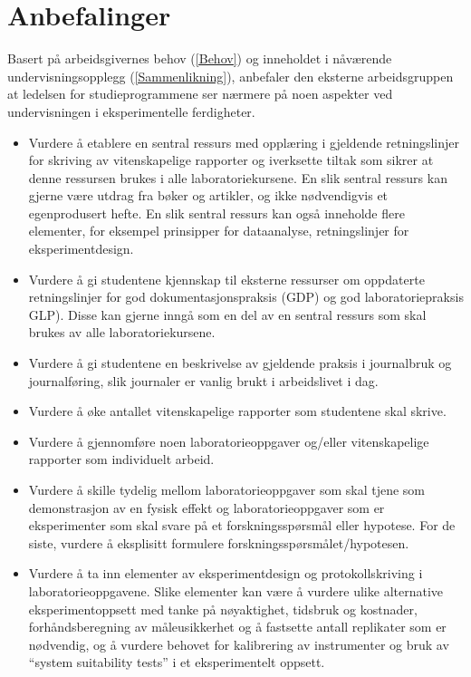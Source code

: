 \documentclass{article}
\begin{document}
\section{Anbefalinger}
Basert på arbeidsgivernes behov (\cref{Behov}) og inneholdet i nåværende undervisningsopplegg (\cref{Sammenlikning}), anbefaler den eksterne arbeidsgruppen at ledelsen for studieprogrammene ser nærmere på noen aspekter ved undervisningen i eksperimentelle ferdigheter.
\begin{itemize}
  \item Vurdere å etablere en sentral ressurs med opplæring i gjeldende retningslinjer for skriving av vitenskapelige rapporter og iverksette tiltak som sikrer at denne  ressursen brukes i alle laboratoriekursene. En slik sentral ressurs kan gjerne være utdrag fra bøker og artikler, og ikke nødvendigvis et egenprodusert hefte. En slik sentral ressurs kan også inneholde flere elementer, for eksempel prinsipper for dataanalyse, retningslinjer for eksperimentdesign.  
   \item Vurdere å gi studentene kjennskap til eksterne ressurser om oppdaterte retningslinjer for god dokumentasjonspraksis (GDP) og god laboratoriepraksis GLP). Disse kan gjerne inngå som en del av en sentral ressurs som skal brukes av alle laboratoriekursene.
      \item Vurdere å gi studentene en beskrivelse av gjeldende praksis i journalbruk og journalføring, slik journaler er vanlig brukt i arbeidslivet i dag.
  \item Vurdere å øke antallet vitenskapelige rapporter som studentene skal skrive. 
  \item Vurdere å gjennomføre noen laboratorieoppgaver og/eller vitenskapelige rapporter som individuelt arbeid.
  \item Vurdere å skille tydelig mellom laboratorieoppgaver som skal tjene som demonstrasjon av en fysisk effekt og laboratorieoppgaver som er eksperimenter som skal svare på et forskningsspørsmål eller hypotese. For de siste, vurdere å eksplisitt formulere forskningsspørsmålet/hypotesen.
  \item Vurdere å ta inn elementer av eksperimentdesign og protokollskriving i laboratorieoppgavene. Slike elementer kan være å vurdere ulike alternative eksperimentoppsett med tanke på nøyaktighet, tidsbruk og kostnader, forhåndsberegning av måleusikkerhet og å fastsette antall replikater som er nødvendig, og å vurdere behovet for kalibrering av instrumenter og bruk av ``system suitability tests'' i et eksperimentelt oppsett.
\end{itemize}
\end{document}
